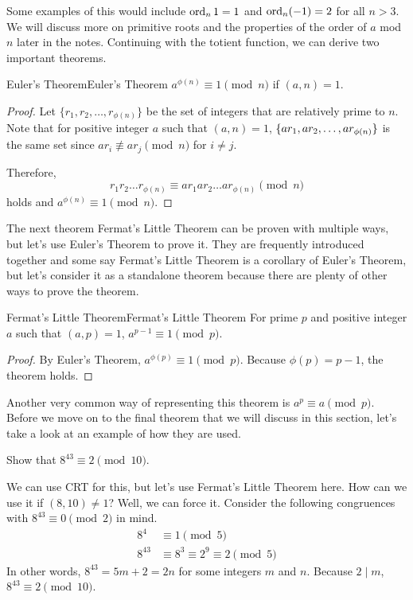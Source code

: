 \documentclass[../../main.tex]{subfiles}
\begin{document}
Some examples of this would include $\operatorname{ord}_n 1 = 1$ and
$\operatorname{ord}_n (-1) = 2$ for all $n > 3$. We will discuss more on
primitive roots and the properties of the order of $a$ mod $n$
later in the notes. Continuing with the totient function,
we can derive two important theorems.

\begin{theorem}{Euler's Theorem}{Euler's Theorem}
$a^{\phi(n)} \equiv 1 \pmod{n}$ if $(a, n) = 1$.
\end{theorem}
\begin{proof}
Let $\{ r_1, r_2, \ldots, r_{\phi(n)} \}$ be the set of integers
that are relatively prime to $n$. Note that for positive integer $a$
such that $(a, n) = 1$, $\{ ar_1, ar_2, \ldots, \linebreak
ar_{\phi(n)} \}$ is the same set since $ar_i \not\equiv ar_j \pmod{n}$
for $i \neq j$.

Therefore,
\[
r_1 r_2 \ldots r_{\phi(n)}
\equiv ar_1 ar_2 \ldots ar_{\phi(n)} \pmod{n}
\]
holds and $a^{\phi(n)} \equiv 1 \pmod{n}$.
\end{proof}

The next theorem Fermat's Little Theorem can be proven with multiple
ways, but let's use Euler's Theorem to prove it. They are frequently
introduced together and some say Fermat's Little Theorem is a
corollary of Euler's Theorem, but let's consider it as a standalone
theorem because there are plenty of other ways to prove the theorem.

\begin{theorem}{Fermat's Little Theorem}{Fermat's Little Theorem}
For prime $p$ and positive integer $a$ such that $(a, p) = 1$,
$a^{p-1} \equiv 1 \pmod{p}$.
\end{theorem}
\begin{proof}
By Euler's Theorem, $a^{\phi(p)} \equiv 1 \pmod{p}$. Because
$\phi(p) = p - 1$, the theorem holds.
\end{proof}

Another very common way of representing this theorem is
$a^p \equiv a \pmod{p}$. Before we move on to the final theorem
that we will discuss in this section, let's take a look at an
example of how they are used.

\begin{problem}{}{}
Show that $8^{43} \equiv 2 \pmod{10}$.
\end{problem}
\begin{solution}
We can use CRT for this, but let's use Fermat's Little Theorem here.
How can we use it if $(8, 10) \neq 1$? Well, we can force it.
Consider the following congruences with $8^{43} \equiv 0 \pmod{2}$
in mind.
\begin{align*}
    8^4 &\equiv 1 \pmod{5} \\
    8^{43} &\equiv 8^3 \equiv 2^9 \equiv 2 \pmod{5}
\end{align*}
In other words, $8^{43} = 5m + 2 = 2n$ for some integers $m$ and $n$.
Because $2 \mid m$, $8^{43} \equiv 2 \pmod{10}$.
\end{solution}
\end{document}
